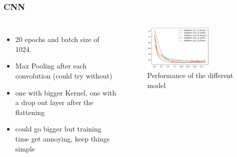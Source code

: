 \documentclass[aspectratio=169]{beamer}
\begin{document}
\begin{frame}[t]
    \frametitle{CNN}
    \begin{columns}

        \begin{itemize}
            \item 20 epochs and batch size of 1024.
            \item Max Pooling after each convolution (could try without)
            \item one with bigger Kernel, one with a drop out layer after the flattening
            \item could go bigger but training time get annoying, keep things simple
        \end{itemize}
        \begin{figure}[ht!]
            \centering
            \includegraphics[width=0.7\textwidth]{figures/cnn_perf.png}
            \caption{Performance of the different model}
            \label{fig:cnn}
        \end{figure}
    \end{columns}
\end{frame}
\end{document}
